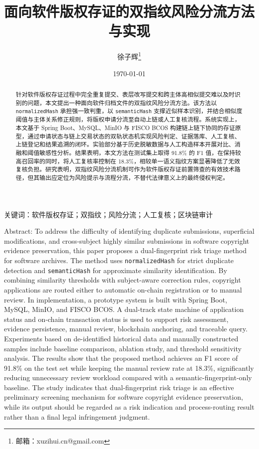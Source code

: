 \documentclass[UTF8,a4paper,zihao=5]{ctexart}
\title{面向软件版权存证的双指纹风险分流方法与实现}
\author{徐子辉\thanks{邮箱：xuzihui.cn@gmail.com}}
\date{\today}
\begin{document}
\maketitle
\vspace{-0.6\baselineskip}

\begin{abstract}
针对软件版权存证过程中完全重复提交、表层改写提交和跨主体高相似提交难以及时识别的问题，本文提出一种面向软件归档文件的双指纹风险分流方法。该方法以 \texttt{normalizedHash} 承担强一致判重，以 \texttt{semanticHash} 支撑近似样本识别，并结合相似度阈值与主体关系修正规则，将版权申请分流至自动上链或人工复核流程。系统实现上，本文基于 Spring Boot、MySQL、MinIO 与 FISCO BCOS 构建链上链下协同的存证原型，通过申请状态与链上交易状态的双轨状态机实现风险判定、证据落库、人工复核、上链登记和结果追溯的闭环。实验部分基于历史脱敏数据与人工构造样本开展对比、消融和阈值敏感性分析。结果表明，本文方法在测试集上取得 91.8\% 的 F1 值，在保持较高召回率的同时，将人工复核率控制在 18.3\%，相较单一语义指纹方案显著降低了无效复核负担。研究表明，双指纹风险分流机制可作为软件版权存证前置筛查的有效技术路径，但其输出应定位为风险提示与流程分流，不替代法律意义上的最终侵权判定。
\end{abstract}

\noindent 关键词：软件版权存证；双指纹；风险分流；人工复核；区块链审计

\vspace{0.4em}
\noindent Abstract:
To address the difficulty of identifying duplicate submissions, superficial modifications, and cross-subject highly similar submissions in software copyright evidence preservation, this paper proposes a dual-fingerprint risk triage method for software archives. The method uses \texttt{normalizedHash} for strict duplicate detection and \texttt{semanticHash} for approximate similarity identification. By combining similarity thresholds with subject-aware correction rules, copyright applications are routed either to automatic on-chain registration or to manual review. In implementation, a prototype system is built with Spring Boot, MySQL, MinIO, and FISCO BCOS. A dual-track state machine of application status and on-chain transaction status is used to support risk assessment, evidence persistence, manual review, blockchain anchoring, and traceable query. Experiments based on de-identified historical data and manually constructed samples include baseline comparison, ablation study, and threshold sensitivity analysis. The results show that the proposed method achieves an F1 score of 91.8\% on the test set while keeping the manual review rate at 18.3\%, significantly reducing unnecessary review workload compared with a semantic-fingerprint-only baseline. The study indicates that dual-fingerprint risk triage is an effective preliminary screening mechanism for software copyright evidence preservation, while its output should be regarded as a risk indication and process-routing result rather than a final legal infringement judgment.
\end{document}
